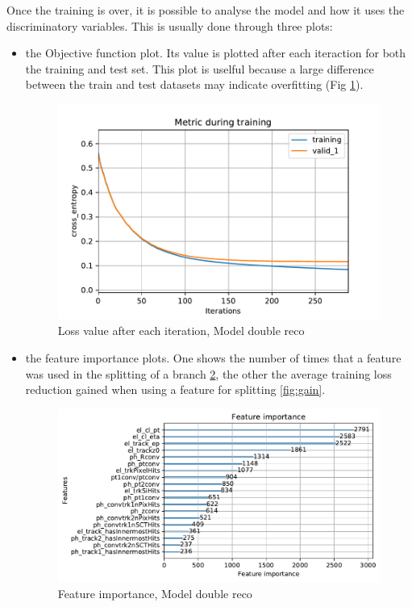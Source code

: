 \documentclass[a4paper, oneside]{book}
\begin{document}
				Once the training is over, it is possible to analyse the model and how it uses the discriminatory variables. This is usually done through three plots:
				\begin{itemize}
					\item the Objective function plot. Its value is plotted after each iteraction for both the training and test set. This plot is uselful because a large difference between the train and test datasets may indicate overfitting (Fig \ref{fig:loss}).
					
					\begin{figure}[h!]
						\centering
						\includegraphics[width=.6\linewidth]{tesi_images/model_hyper_loss.pdf} 
						\caption{Loss value after each iteration, Model double reco}
						\label{fig:loss} 
					\end{figure}
					
					\item the feature importance plots. One shows the number of times that a feature was used in the splitting of a branch \ref{fig:importance}, the other the average training loss reduction gained when using a feature for splitting \ref{fig:gain}.
					
					\begin{figure}[h!]
						\centering
						\includegraphics[width=.8\linewidth]{tesi_images/model_hyper_importance.pdf} 
						\caption{Feature importance, Model double reco}
						\label{fig:importance} 
					\end{figure}
				

\end{itemize}
\end{document}
